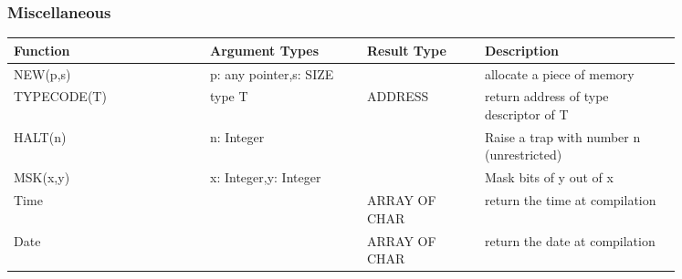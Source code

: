 \documentclass[a4wide,11pt]{article}
\begin{document}
\subsubsection{Miscellaneous}
\begin{longtable}{|p{0.25\linewidth}|p{0.2\linewidth}|p{0.15\linewidth}|p{0.25\linewidth}|}
\hline
Function & Argument Types & Result Type & Description \\
\hline\hline
NEW(p,s) & p: any pointer,\newline s: SIZE & & allocate a piece of memory \\
TYPECODE(T) & type T & ADDRESS & return address of type descriptor of T \\
HALT(n) & n: Integer & & Raise a trap with number n (unrestricted) \\
MSK(x,y) & x: Integer,\newline y: Integer & & Mask bits of y out of x \\
Time & & ARRAY OF CHAR & return the time at compilation \\
Date & & ARRAY OF CHAR & return the date at compilation \\
\hline
\end{longtable}

\end{document}
